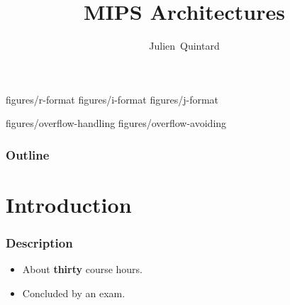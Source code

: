 
%
%



%
%

\title{MIPS Architectures}

%
%

\author
{
  Julien~Quintard
}

%
%

		{figures/r-format}
		{figures/i-format}
		{figures/j-format}

		{figures/overflow-handling}
		{figures/overflow-avoiding}

%
%



%
%

\begin{frame}
  \titlepage

  \begin{center}
    \logos
  \end{center}
\end{frame}

%
%

\begin{frame}
  \frametitle{Outline}
  \tableofcontents
\end{frame}

%
%

\section{Introduction}


\begin{frame}
  \frametitle{Description}

  \begin{itemize}[<+->]
    \item
      About \textbf{thirty} course hours.
    \item
      Concluded by an exam.
  \end{itemize}
\end{frame}

